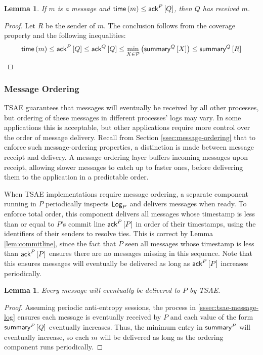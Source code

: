\documentclass[]             %
{NASA}                       %
\newtheorem{lemma}[theorem]{Lemma}
\theoremstyle{definition}
\begin{document}
\begin{lemma}
  \label{lem:ack-vector}
  If $m$ is a message and $\mathsf{time}\left(m\right) \leq \textsf{ack}^{P}\left[Q\right]$, then $Q$ has received
  $m$.
\end{lemma}
\begin{proof}
  Let $R$ be the sender of $m$. The conclusion follows from the coverage
  property and the following inequalities:
\[\mathsf{time}\left(m\right) \leq \textsf{ack}^{P}\left[Q\right] \leq \textsf{ack}^{Q}\left[Q\right] \leq \min_{X \in
    \mathcal{P}} \left(\textsf{summary}^{Q}\left[X\right]\right) \leq \textsf{summary}^{Q}\left[R\right]\]
\end{proof}


\subsubsection{Message Ordering}
\label{sssec:tsae-message-ordering}
TSAE guarantees that messages will eventually be received by all other
processes, but ordering of these messages in different processes' logs
may vary. In some applications this is acceptable, but other
applications require more control over the order of message
delivery. Recall from Section \ref{ssec:message-ordering} that to
enforce such message-ordering properties, a distinction is made
between message receipt and delivery. A message ordering layer buffers
incoming messages upon receipt, allowing slower messages to catch up
to faster ones, before delivering them to the application in a
predictable order.

When TSAE implementations require message ordering, a separate
component running in $P$ periodically inspects $\textsf{Log}_{P}$ and delivers
messages when ready. To enforce total order, this component delivers
all messages whose timestamp is less than or equal to $P$'s commit
line $\textsf{ack}^{P}\left[P\right]$ in order of their timestamps, using the identifiers
of their senders to resolve ties. This is correct by Lemma
\ref{lem:commitline}, since the fact that $P$ seen all messages whose
timestamp is less than $\textsf{ack}^{P}\left[P\right]$ ensures there are no messages
missing in this sequence. Note that this ensures messages will
eventually be delivered as long as $\textsf{ack}^{P}\left[P\right]$ increases
periodically.

\begin{lemma}
  Every message will eventually be delivered to $P$ by TSAE.
\end{lemma}
\begin{proof}
  Assuming periodic anti-entropy sessions, the process in
  \ref{sssec:tsae-message-log} ensures each message is eventually
  received by $P$ and each value of the form $\textsf{summary}^{P}\left[Q\right]$
  eventually increases. Thus, the minimum entry in $\textsf{summary}^{P}$
  will eventually increase, so each $m$ will be delivered as long as
  the ordering component runs periodically.
\end{proof}
\end{document}
